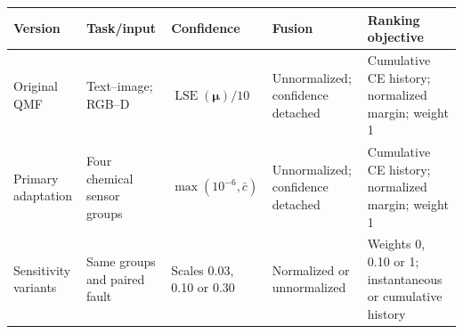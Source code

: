 \begin{tabular}{p{}p{}p{}p{}p{}}
\toprule
Version & Task/input & Confidence & Fusion & Ranking objective \\
\midrule
Original QMF & Text--image; RGB--D & $\operatorname{LSE}(\boldsymbol\mu)/10$ & Unnormalized; confidence detached & Cumulative CE history; normalized margin; weight 1 \\
Primary adaptation & Four chemical sensor groups & $\max(10^{-6},\bar c)$ & Unnormalized; confidence detached & Cumulative CE history; normalized margin; weight 1 \\
Sensitivity variants & Same groups and paired fault & Scales 0.03, 0.10 or 0.30 & Normalized or unnormalized & Weights 0, 0.10 or 1; instantaneous or cumulative history \\
\bottomrule
\end{tabular}
